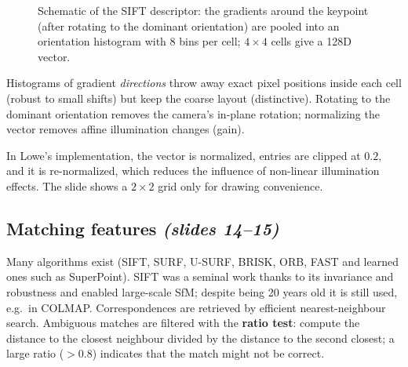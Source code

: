\documentclass[11pt,a4paper]{article}
\newcommand{\slr}[1]{\texorpdfstring{\emph{(slides #1)}}{(slides #1)}}
\theoremstyle{definition}
\theoremstyle{plain}
\theoremstyle{remark}
\begin{document}
\begin{figure}[H]
\centering
{}
\caption{Schematic of the SIFT descriptor: the gradients around the keypoint (after rotating to the dominant orientation) are
pooled into an orientation histogram with 8 bins per cell; $4\times4$ cells give a 128D vector.}
\end{figure}

\begin{intuition}
Histograms of gradient \emph{directions} throw away exact pixel positions inside each cell (robust to small shifts) but keep
the coarse layout (distinctive). Rotating to the dominant orientation removes the camera's in-plane rotation; normalizing the vector
removes affine illumination changes (gain).
\end{intuition}

\begin{beyond}
In Lowe's implementation, the vector is normalized, entries are clipped at $0.2$, and it is re-normalized, which reduces the
influence of non-linear illumination effects. The slide shows a $2\times2$ grid only for drawing convenience.
\end{beyond}

\subsection{Matching features \slr{14--15}}
Many algorithms exist (SIFT, SURF, U-SURF, BRISK, ORB, FAST and learned ones such as SuperPoint). SIFT was a seminal work thanks to its
invariance and robustness and enabled large-scale SfM; despite being 20 years old it is still used, e.g.\ in COLMAP.
Correspondences are retrieved by efficient nearest-neighbour search. Ambiguous matches are filtered with the \textbf{ratio test}:
compute the distance to the closest neighbour divided by the distance to the second closest; a large ratio ($>0.8$) indicates that the
match might not be correct.
\end{document}
